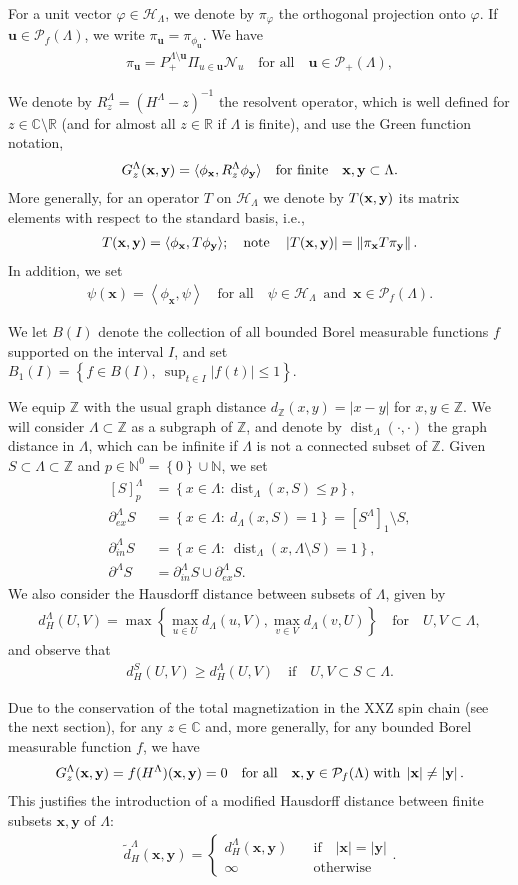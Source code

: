 \documentclass[12pt, a4paper,reqno]{amsart}
\newcommand{\fg}{\color{ForestGreen}}
\numberwithin{equation}{section}
\DeclareMathOperator{\dist}{dist}
\newcommand\R{\mathbb R}
\newcommand\N{\mathbb N}
\newcommand\C{\mathbb C}
\newcommand\Z{\mathbb Z}
\newcommand\x{\mathbf{x}}
\newcommand\y{\mathbf{y}}
\renewcommand\u{\mathbf{u}}
\newcommand\cN{\mathcal{N}}
\newcommand\cH{\mathcal{H}}
\newcommand\cP{\mathcal{P}}
\newcommand\vphi{\varphi}
\newcommand\wtilde{\widetilde}
\newcommand\be{\begin{equation}\begin{aligned}}
\newcommand\ee{\end{aligned}\end{equation}}
\newcommand{\abs}[1]{\left\lvert #1 \right\rvert}
\newcommand{\norm}[1]{\left\lVert #1 \right\rVert}
\newcommand{\scal}[1]{\left\langle #1 \right\rangle}
\newcommand{\set}[1]{\left\{ #1 \right\}}
\newcommand{\pa}[1]{\left( #1 \right)}
\newcommand\La{\Lambda}
\newcommand{\qtx}[1]{\quad\text{#1}\quad}
\newcommand{\mqtx}[1]{\; \ \text{#1}\; \  }
\newcommand{\sqtx}[1]{\;\text{#1}\;}
\begin{document}
 For a unit vector $\vphi \in \cH_\La$,  we denote by  $\pi_\vphi$ the orthogonal projection onto $\vphi$.  If $\u \in \cP_f(\La)$, we write $\pi_\u=\pi_{{\phi_\u}}$.   We have 
 \be\label{piu}
\pi_{\u}=  P_+^{\La\setminus \u}\Pi_{u\in \u} \cN_u   \qtx{for all} \u \in \cP_+(\La),
\ee




    We  denote by $R_z^\Lambda=\pa{H^\La-z}^{-1}$   the resolvent operator,  which is  well defined for    $z\in\C\setminus \R$ (and for almost all  $z\in\R$ if $\La$ is finite),  and  use the Green function notation,
\be\label{eq:Green}
G^\La_z({\bf x},{\bf y}) = \langle \phi_{\bf x},R_z^\Lambda \phi_{\bf y}\rangle \qtx{for finite} \x,\y \subset\La.
\ee
More generally, for an operator $T$ on $\cH_\La$ we  denote by $T({\bf x},{\bf y})$ its matrix elements with respect to the standard basis, i.e., 
 \be\label{eq:Txy}
T({\bf x},{\bf y}) = \langle \phi_{\bf x},T \phi_{\bf y}\rangle;  \qtx{note} \abs{T({\bf x},{\bf y})}=\norm{\pi_{\x}T\pi_{\y}}.
\ee
In addition, we set
\be
\psi(\x)=\scal{\phi_\x, \psi} \qtx{for all} \psi \in \cH_\La \mqtx{and} \x\in \cP_f (\La).
\ee

 We let $B(I)$   denote the collection of all bounded Borel measurable functions $f$  supported on the interval  $I$, and set $B_1(I)=\set{f\in B(I),\ \sup_{t\in I} \abs{f(t)}\le 1}$.

We equip $\Z$ with the usual graph  distance  $d_\Z(x,y)= \abs{x-y}$ for  $x,y \in \Z$.  We will  consider $\La \subset \Z$ as a subgraph of $\Z$,  and
 denote by $\dist_\La( \cdot,\cdot) $ the  graph distance in $\La$, which  can be infinite if $\La$ is not a connected subset of $\Z$.
  Given  $ S\subset \Lambda\subset \Z$ and  $p\in\N^0=  \set{0} \cup \N$,   we set
   \be
{[S]^\La_p} & = \set{x\in\La: \dist_\La\pa{x,S}\le p},\\
\partial_{ex}^\La S& = \set{x\in\Lambda:\ d_\La\pa{x,S}=1}= [S^\La]_1\setminus S,\\
 \partial_{in}^\La S& = \set{x\in\Lambda:\ \dist_\La \pa{x, \La \setminus S}=1},\\
 \partial^\La S & =   \partial_{in}^\La S \cup  \partial_{ex}^\La S.
\ee
 We also  consider the Hausdorff distance between subsets of $\La$, given by
 \be
 d_H^\La (U,V)= \max \set{\max_{u\in U} d_\La (u, V), \max_{v\in V} d_\La (v, U)   }\qtx{for}  U,V \subset \La,
 \ee
and observe that
 \be
 d_H^S (U,V) \ge d_H^\La (U,V) \qtx{if}   U,V\subset S \subset \La.
 \ee
 
 
Due to the conservation of the total magnetization in the XXZ spin chain (see the next section), for any $z\in \C$ and, more generally, for any bounded Borel measurable function $f$,  we have 
\be\label{fxy0}
 G_z^\La({\bf x},{\bf y})= f(H^{\La})({\bf x},{\bf y})=0 \qtx{for all} \x,\y \in \cP_f(\La) \sqtx{with}  \abs{\x}\ne \abs{\y}.
\ee
This  justifies the introduction of a modified Hausdorff distance between  {\fg finite} subsets $\x, \y$ of $\La$:
\be
 \wtilde d_H^\La (\x,\y)= \begin{cases} d_H^\La (\x,\y) & \qtx{if} \abs{\x}=\abs{\y}\\
 \infty & \qtx{otherwise}
 \end{cases}.
\ee
\end{document}

